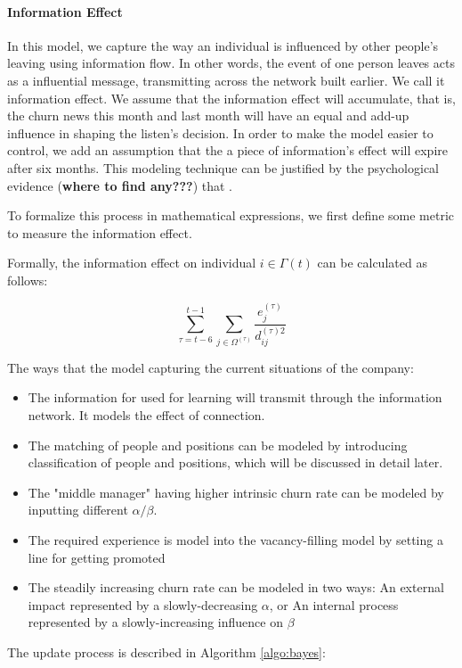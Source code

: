 \documentclass[tcn = 37075, sheet = true, abstract = true]{mcmthesis}
\begin{document}
\paragraph{Information Effect}
In this model, we capture the way an individual is influenced by other people's leaving using information flow. In other words, the event of one person leaves acts as a influential message, transmitting across the network built earlier. We call it information effect. We assume that the information effect will accumulate, that is, the churn news this month and last month will have an equal and add-up influence in shaping the listen's decision. In order to make the model easier to control, we add an assumption that the a piece of information's effect will expire after six months. This modeling technique can be justified by the psychological evidence (\textbf{where to find any???}) that . 

To formalize this process in mathematical expressions, we first define some metric to measure the information effect. 



Formally, the information effect on individual $i\in \Gamma{(t)}$ can be calculated as follows:

$$\displaystyle \sum_{\tau=t-6}^{t-1}\sum_{j\in \Omega^{(\tau)}}\frac{e_j^{(\tau)}}{d_{ij}^{(\tau)2}}$$

The ways that the model capturing the current situations of the company:
\begin{itemize}
\item The information for used for learning will transmit through the information network. It models the effect of connection.
\item The matching of people and positions can be modeled by introducing classification of people and positions, which will be discussed in detail later.
\item The "middle manager" having higher intrinsic churn rate can be modeled by inputting different $\alpha/ \beta$.
\item The required experience is model into the vacancy-filling model by setting a line for getting promoted
\item The steadily increasing churn rate can be modeled in two ways: An external impact represented by a slowly-decreasing $\alpha$, or An internal process represented by a slowly-increasing influence on $\beta$
\end{itemize}


The update process is described in Algorithm \ref{algo:bayes}:
\end{document}
